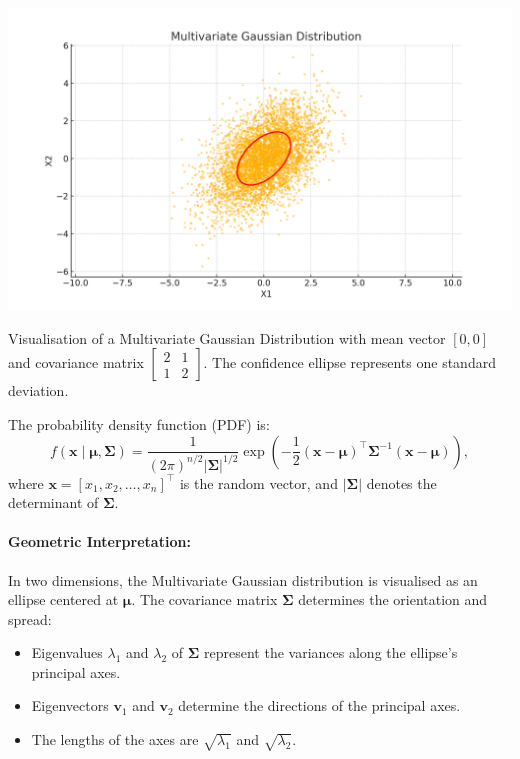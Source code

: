 \begin{marginfigure}
    \includegraphics[width=\linewidth]{img/multivariate_gaussian_distribution.png}
    \caption{Visualisation of a Multivariate Gaussian Distribution with mean vector \([0, 0]\) and covariance matrix \(\begin{bmatrix} 2 & 1 \\ 1 & 2 \end{bmatrix}\). The confidence ellipse represents one standard deviation.}
    \label{fig:multivariate_gaussian}
\end{marginfigure}

The probability density function (PDF) is:
\[
    f(\mathbf{x} \mid \boldsymbol{\mu}, \boldsymbol{\Sigma}) = \frac{1}{(2\pi)^{n/2} |\boldsymbol{\Sigma}|^{1/2}}
    \exp\left(-\frac{1}{2} (\mathbf{x} - \boldsymbol{\mu})^\top \boldsymbol{\Sigma}^{-1} (\mathbf{x} - \boldsymbol{\mu})\right),
\]
where $\mathbf{x} = [x_1, x_2, \ldots, x_n]^\top$ is the random vector, and $|\boldsymbol{\Sigma}|$ denotes the determinant of $\boldsymbol{\Sigma}$.

\paragraph{Geometric Interpretation:}
In two dimensions, the Multivariate Gaussian distribution is visualised as an ellipse centered at $\boldsymbol{\mu}$. The covariance matrix $\boldsymbol{\Sigma}$ determines the orientation and spread:
\begin{itemize}
    \item Eigenvalues $\lambda_1$ and $\lambda_2$ of $\boldsymbol{\Sigma}$ represent the variances along the ellipse's principal axes.
    \item Eigenvectors $\mathbf{v}_1$ and $\mathbf{v}_2$ determine the directions of the principal axes.
    \item The lengths of the axes are $\sqrt{\lambda_1}$ and $\sqrt{\lambda_2}$.
\end{itemize}

